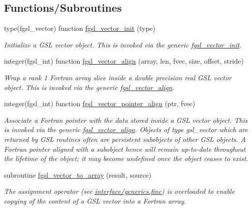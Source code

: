 \subsection*{Functions/\+Subroutines}
\begin{DoxyCompactItemize}
\item 
type(fgsl\+\_\+vector) function \hyperlink{array_8finc_a0b6fe341146fbb3dfb27386e73c5d042}{fgsl\+\_\+vector\+\_\+init} (type)
\begin{DoxyCompactList}\small\item\em Initialize a G\+S\+L vector object. This is invoked via the generic \hyperlink{interfacefgsl__vector__init}{fgsl\+\_\+vector\+\_\+init}. \end{DoxyCompactList}\item 
integer(fgsl\+\_\+int) function \hyperlink{array_8finc_aa6c28c6cc37d807bc8bc0fcf4ab7ad57}{fgsl\+\_\+vector\+\_\+align} (array, len, fvec, size, offset, stride)
\begin{DoxyCompactList}\small\item\em Wrap a rank 1 Fortran array slice inside a double precision real G\+S\+L vector object. This is invoked via the generic \hyperlink{interfacefgsl__vector__align}{fgsl\+\_\+vector\+\_\+align}. \end{DoxyCompactList}\item 
integer(fgsl\+\_\+int) function \hyperlink{array_8finc_a3f528d8f3b1aa8218339bc8fdb41497c}{fgsl\+\_\+vector\+\_\+pointer\+\_\+align} (ptr, fvec)
\begin{DoxyCompactList}\small\item\em Associate a Fortran pointer with the data stored inside a G\+S\+L vector object. This is invoked via the generic \hyperlink{interfacefgsl__vector__align}{fgsl\+\_\+vector\+\_\+align}. Objects of type {\ttfamily gsl\+\_\+vector} which are returned by G\+S\+L routines often are persistent subobjects of other G\+S\+L objects. A Fortran pointer aligned with a subobject hence will remain up-\/to-\/date throughout the lifetime of the object; it may become undefined once the object ceases to exist. \end{DoxyCompactList}\item 
subroutine \hyperlink{array_8finc_a740b61c719ee64b92abc804915115255}{fgsl\+\_\+vector\+\_\+to\+\_\+array} (result, source)
\begin{DoxyCompactList}\small\item\em The assignment operator (see \hyperlink{generics_8finc}{interface/generics.\+finc}) is overloaded to enable copying of the content of a G\+S\+L vector into a Fortran array. \end{DoxyCompactList}\item 

\end{DoxyCompactItemize}
